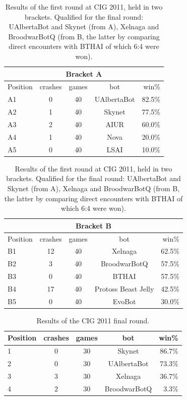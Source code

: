 \documentclass[journal]{IEEEtran}
\begin{document}
\begin{table}[t]
\caption{Results of the first round at CIG 2011, held in two brackets.
Qualified for the final round: UAlbertaBot and Skynet (from A), Xelnaga
and BroodwarBotQ (from B, the latter by comparing direct encounters
with BTHAI of which 6:4 were won).}
\label{tab:cig-first-round}
\begin{small}
\begin{center}
\begin{tabular}{|l|c|c|c|r|}
\hline
\multicolumn{5}{|c|}{Bracket A} \\ \hline
Position & crashes & games & bot	& win\%\\ \hline
A1 & 0 &	 40 &	 UAlbertaBot & 82.5\% \\
A2 & 1 &  	 40 &	 Skynet	  &  77.5\% \\
A3 & 2 &	 40 &	 AIUR	  &  60.0\% \\
A4 & 1 &	 40 &	 Nova	  &  20.0\% \\
A5 & 0 &	 40 &	 LSAI	  &  10.0\%\\
\hline
\end{tabular}
\begin{tabular}{|l|c|c|c|r|}
\hline
\multicolumn{5}{|c|}{Bracket B} \\ \hline
Position & crashes & games & bot	& win\%\\ \hline
B1 & 12 &	 40 &	 Xelnaga &	 62.5\%\\
B2 & 3 &   40 &	 BroodwarBotQ  &  57.5\%\\
B3 & 0 &	 40 &	 BTHAI	  &  57.5\%\\
B4 & 17 &	 40 &	 Protoss Beast Jelly  & 42.5\%\\
B5 & 0 &	 40 &	 EvoBot	  &  30.0\%\\
\hline
\end{tabular}
\end{center}
\end{small}
\end{table}

\begin{table}[b]
\caption{Results of the CIG 2011 final round.}
\label{tab:cig-final-round}
\begin{small}
\begin{center}
\begin{tabular}{|l|c|c|c|r|}
\hline
Position & crashes & games & bot	& win\%\\ \hline
1 & 0 &  30 &	 Skynet	  		&  86.7\%\\
2 & 0 &	 30 &	 UAlbertaBot 	&  73.3\%\\
3 & 3 &	 30 &	 Xelnaga  		&  36.7\%\\
4 & 2 &	 30 &	 BroodwarBotQ  	&  3.3\%\\
\hline
\end{tabular}
\end{center}
\end{small}
\end{table}
\end{document}
